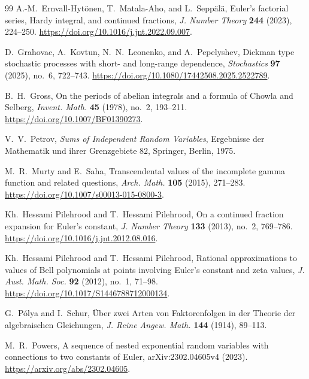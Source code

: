 \documentclass[11pt]{article}
\theoremstyle{keio}
\theoremstyle{definition}
\theoremstyle{remark}
\begin{document}
\begin{thebibliography}{99}
A.-M.~Ernvall-Hyt\"onen, T.~Matala-Aho, and L.~Sepp\"al\"a,
\newblock Euler's factorial series, Hardy integral, and continued fractions,
\newblock \emph{J. Number Theory} \textbf{244} (2023), 224--250.
\newblock \url{https://doi.org/10.1016/j.jnt.2022.09.007}.

D.~Grahovac, A.~Kovtun, N.~N.~Leonenko, and A.~Pepelyshev,
\newblock Dickman type stochastic processes with short- and long-range
dependence,
\newblock \emph{Stochastics} \textbf{97} (2025), no.~6, 722--743.
\newblock \url{https://doi.org/10.1080/17442508.2025.2522789}.

B.~H.~Gross,
\newblock On the periods of abelian integrals and a formula of Chowla and
Selberg,
\newblock \emph{Invent. Math.} \textbf{45} (1978), no.~2, 193--211.
\newblock \url{https://doi.org/10.1007/BF01390273}.

V.~V.~Petrov,
\newblock \emph{Sums of Independent Random Variables},
\newblock Ergebnisse der Mathematik und ihrer Grenzgebiete 82,
Springer, Berlin, 1975.

M.~R.~Murty and E.~Saha,
\newblock Transcendental values of the incomplete gamma function and
related questions,
\newblock \emph{Arch. Math.} \textbf{105} (2015), 271--283.
\newblock \url{https://doi.org/10.1007/s00013-015-0800-3}.

Kh.~Hessami Pilehrood and T.~Hessami Pilehrood,
\newblock On a continued fraction expansion for Euler's constant,
\newblock \emph{J. Number Theory} \textbf{133} (2013), no.~2, 769--786.
\newblock \url{https://doi.org/10.1016/j.jnt.2012.08.016}.

Kh.~Hessami Pilehrood and T.~Hessami Pilehrood,
\newblock Rational approximations to values of Bell polynomials at points
involving Euler's constant and zeta values,
\newblock \emph{J. Aust. Math. Soc.} \textbf{92} (2012), no.~1, 71--98.
\newblock \url{https://doi.org/10.1017/S1446788712000134}.

G.~P\'olya and I.~Schur,
\newblock \"Uber zwei Arten von Faktorenfolgen in der Theorie der
algebraischen Gleichungen,
\newblock \emph{J. Reine Angew. Math.} \textbf{144} (1914), 89--113.

M.~R.~Powers,
\newblock A sequence of nested exponential random variables with connections
to two constants of Euler,
\newblock arXiv:2302.04605v4 (2023).
\newblock \url{https://arxiv.org/abs/2302.04605}.


\end{thebibliography}
\end{document}
